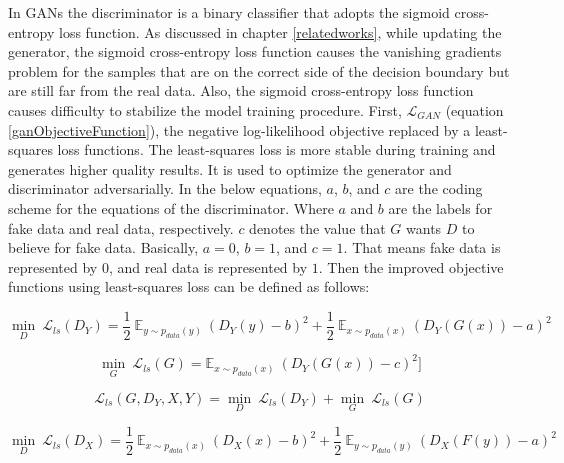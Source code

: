 In \acp{GAN} the discriminator is a binary classifier that adopts the sigmoid cross-entropy loss function. As discussed in chapter \ref{relatedworks}, while updating the generator, the sigmoid cross-entropy loss function causes the vanishing gradients problem for the samples that are on the correct side of the decision boundary but are still far from the real data.  Also, the sigmoid cross-entropy loss function causes difficulty to stabilize the model training procedure\cite{mao2017squares}. First, $\mathcal{L}_{GAN}$ (equation \ref{ganObjectiveFunction}), the negative log-likelihood objective replaced by a least-squares loss functions\cite{mao2017squares}. The least-squares loss is more stable during training and generates higher quality results\cite{mao2017squares}. It is used to optimize the generator and discriminator adversarially. In the below equations, $a$, $b$, and $c$ are the coding scheme for the equations of the discriminator. Where $a$ and $b$ are the labels for fake data and real data, respectively. $c$ denotes the value that $G$ wants $D$ to believe for fake data. Basically, $a = 0$, $b = 1$, and $c = 1$. That means fake data is represented by $0$, and real data is represented by $1$. Then the improved objective functions using least-squares loss can be defined as follows:

    \begin{equation}\label{lsgan1}
        \underset{D}{\min}\ \mathcal{L}_{ls}(D_Y) = \frac{1}{2}\ \mathbb{E}_{y \sim p_{data}(y)}\ (D_Y(y) - b)^2 + 
        \frac{1}{2}\ \mathbb{E}_{x \sim p_{data}(x)}\ (D_Y(G(x)) - a)^2
    \end{equation}
    
    \begin{equation}\label{lsgan2}
        \underset{G}{\min}\ \mathcal{L}_{ls}(G) = \mathbb{E}_{x \sim p_{data}(x)}\ (D_Y(G(x)) - c)^2]
    \end{equation}
    
    \begin{equation}\label{lsgan3}
    \mathcal{L}_{ls}(G, D_Y, X, Y) =  \underset{D}{\min}\ \mathcal{L}_{ls}(D_Y) + \underset{G}{\min}\ \mathcal{L}_{ls}(G)
    \end{equation}
    
    \begin{equation}\label{lsgan4}
        \underset{D}{\min}\ \mathcal{L}_{ls}(D_X) = \frac{1}{2}\ \mathbb{E}_{x \sim p_{data}(x)}\ (D_X(x) - b)^2 + 
        \frac{1}{2}\ \mathbb{E}_{y \sim p_{data}(y)}\ (D_X(F(y)) - a)^2
    \end{equation}
    
